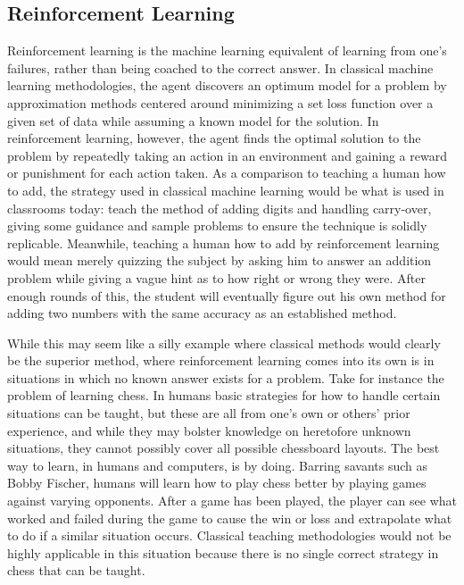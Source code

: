 \subsection{Reinforcement Learning}



Reinforcement learning is the machine learning equivalent of learning from one's
failures,
rather than being coached to the correct answer.
%
In classical machine learning methodologies,
the agent discovers an optimum model for a problem by approximation methods
centered around minimizing a set loss function over a given set of data
while assuming a known model for the solution.
%
In reinforcement learning,
however,
the agent finds the optimal solution to the problem by repeatedly taking an
action in an environment and gaining a reward or punishment for each
action taken.
%
As a comparison to teaching a human how to add,
the strategy used in classical machine learning would be what is used in
classrooms today:
teach the method of adding digits and handling carry-over,
giving some guidance and sample problems to ensure the technique is solidly
replicable.
%
Meanwhile, teaching a human how to add by reinforcement learning would
mean merely quizzing the subject by asking him to answer an addition problem
while giving a vague hint as to how right or wrong they were.
%
After enough rounds of this,
the student will eventually figure out his own method for adding two numbers
with the same accuracy as an established method.

While this may seem like a silly example where classical methods would clearly
be the superior method,
where reinforcement learning comes into its own is in situations in which no
known answer exists for a problem.
%
Take for instance the problem of learning chess.
%
In humans
basic strategies for how to handle certain situations can be taught,
but these are all from one's own or others' prior experience,
and while they may bolster knowledge on heretofore unknown situations,
they cannot possibly cover all possible chessboard layouts.
%
The best way to learn, in humans and computers, is by doing.
%
Barring savants such as Bobby Fischer,
humans will learn how to play chess better by playing games against varying
opponents.
%
After a game has been played,
the player can see what worked and failed during the game to cause the win or
loss and extrapolate what to do if a similar situation occurs.
%
Classical teaching methodologies would not be highly applicable in this
situation because there is no single correct strategy in chess that can
be taught.





